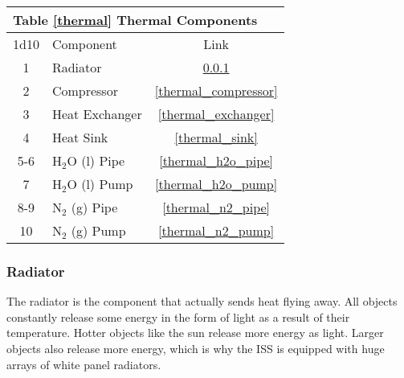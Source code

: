 \documentclass[a4paper]{article}
\begin{document}
\vspace{0.5cm} \hspace{0.25\linewidth}
\begin{tabular}{| c | l | c |}
\toprule
\multicolumn{3}{|l|}{Table \ref{thermal} Thermal Components} \\
\toprule
1d10 & Component & Link \\
\midrule
1 & Radiator & \ref{thermal_radiator} \\
2 & Compressor & \ref{thermal_compressor} \\
3 & Heat Exchanger & \ref{thermal_exchanger} \\
4 & Heat Sink & \ref{thermal_sink} \\
\midrule
5-6 & H$_2$O (l) Pipe & \ref{thermal_h2o_pipe} \\
7 & H$_2$O (l) Pump & \ref{thermal_h2o_pump} \\
8-9 & N$_2$ (g) Pipe & \ref{thermal_n2_pipe} \\
10 & N$_2$ (g) Pump & \ref{thermal_n2_pump} \\
\bottomrule
\end{tabular}

\hspace{-18pt} \subsubsection{Radiator} \label{thermal_radiator} \vspace{-0.2cm}

The radiator is the component that actually sends heat flying away. All objects constantly release some energy in the form of light as a result of their temperature. Hotter objects like the sun release more energy as light. Larger objects also release more energy, which is why the ISS is equipped with huge arrays of white panel radiators.
\end{document}
